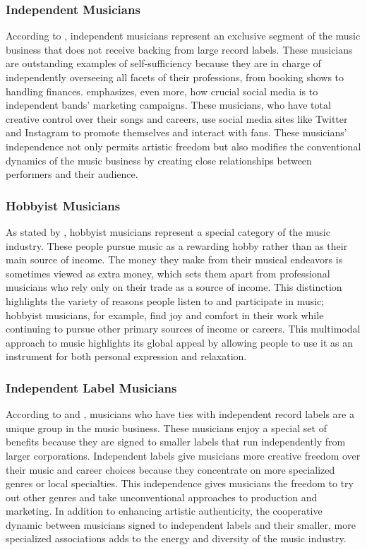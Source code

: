\subsubsection{Independent Musicians}
According to \textcite{arditi21}, independent musicians represent an exclusive segment of the music business that does not receive backing from large record labels. These musicians are outstanding examples of self-sufficiency because they are in charge of independently overseeing all facets of their professions, from booking shows to handling finances. \textcite{martinez21} emphasizes, even more, how crucial social media is to independent bands' marketing campaigns. These musicians, who have total creative control over their songs and careers, use social media sites like Twitter and Instagram to promote themselves and interact with fans. These musicians' independence not only permits artistic freedom but also modifies the conventional dynamics of the music business by creating close relationships between performers and their audience.

\subsubsection{Hobbyist Musicians}
As stated by \textcite{arditi21}, hobbyist musicians represent a special category of the music industry. These people pursue music as a rewarding hobby rather than as their main source of income. The money they make from their musical endeavors is sometimes viewed as extra money, which sets them apart from professional musicians who rely only on their trade as a source of income. This distinction highlights the variety of reasons people listen to and participate in music; hobbyist musicians, for example, find joy and comfort in their work while continuing to pursue other primary sources of income or careers. This multimodal approach to music highlights its global appeal by allowing people to use it as an instrument for both personal expression and relaxation.

\subsubsection{Independent Label Musicians}
According to \textcite{arditi21} and \textcite{martinez21}, musicians who have ties with independent record labels are a unique group in the music business. These musicians enjoy a special set of benefits because they are signed to smaller labels that run independently from larger corporations. Independent labels give musicians more creative freedom over their music and career choices because they concentrate on more specialized genres or local specialties. This independence gives musicians the freedom to try out other genres and take unconventional approaches to production and marketing. In addition to enhancing artistic authenticity, the cooperative dynamic between musicians signed to independent labels and their smaller, more specialized associations adds to the energy and diversity of the music industry.

